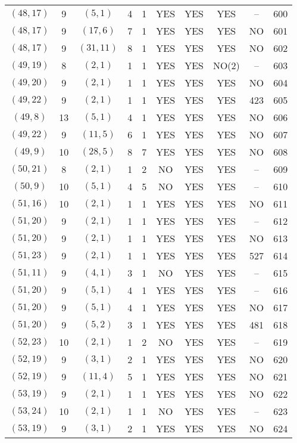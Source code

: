 \begin{longtable}{|c|c|c|c|c|c|c|c|c|c|}
$(48, 17)$ & 9 & $(5, 1)$ & 4 & 1 & YES & YES & YES & -- & 600\\
$(48, 17)$ & 9 & $(17, 6)$ & 7 & 1 & YES & YES & YES & NO & 601\\
$(48, 17)$ & 9 & $(31, 11)$ & 8 & 1 & YES & YES & YES & NO & 602\\
$(49, 19)$ & 8 & $(2, 1)$ & 1 & 1 & YES & YES & NO(2) & -- & 603\\
$(49, 20)$ & 9 & $(2, 1)$ & 1 & 1 & YES & YES & YES & NO & 604\\
$(49, 22)$ & 9 & $(2, 1)$ & 1 & 1 & YES & YES & YES & 423 & 605\\
$(49, 8)$ & 13 & $(5, 1)$ & 4 & 1 & YES & YES & YES & NO & 606\\
$(49, 22)$ & 9 & $(11, 5)$ & 6 & 1 & YES & YES & YES & NO & 607\\
$(49, 9)$ & 10 & $(28, 5)$ & 8 & 7 & YES & YES & YES & NO & 608\\
$(50, 21)$ & 8 & $(2, 1)$ & 1 & 2 & NO & YES & YES & -- & 609\\
$(50, 9)$ & 10 & $(5, 1)$ & 4 & 5 & NO & YES & YES & -- & 610\\
$(51, 16)$ & 10 & $(2, 1)$ & 1 & 1 & YES & YES & YES & NO & 611\\
$(51, 20)$ & 9 & $(2, 1)$ & 1 & 1 & YES & YES & YES & -- & 612\\
$(51, 20)$ & 9 & $(2, 1)$ & 1 & 1 & YES & YES & YES & NO & 613\\
$(51, 23)$ & 9 & $(2, 1)$ & 1 & 1 & YES & YES & YES & 527 & 614\\
$(51, 11)$ & 9 & $(4, 1)$ & 3 & 1 & NO & YES & YES & -- & 615\\
$(51, 20)$ & 9 & $(5, 1)$ & 4 & 1 & YES & YES & YES & -- & 616\\
$(51, 20)$ & 9 & $(5, 1)$ & 4 & 1 & YES & YES & YES & NO & 617\\
$(51, 20)$ & 9 & $(5, 2)$ & 3 & 1 & YES & YES & YES & 481 & 618\\
$(52, 23)$ & 10 & $(2, 1)$ & 1 & 2 & NO & YES & YES & -- & 619\\
$(52, 19)$ & 9 & $(3, 1)$ & 2 & 1 & YES & YES & YES & NO & 620\\
$(52, 19)$ & 9 & $(11, 4)$ & 5 & 1 & YES & YES & YES & NO & 621\\
$(53, 19)$ & 9 & $(2, 1)$ & 1 & 1 & YES & YES & YES & NO & 622\\
$(53, 24)$ & 10 & $(2, 1)$ & 1 & 1 & NO & YES & YES & -- & 623\\
$(53, 19)$ & 9 & $(3, 1)$ & 2 & 1 & YES & YES & YES & NO & 624\\

\end{longtable}
